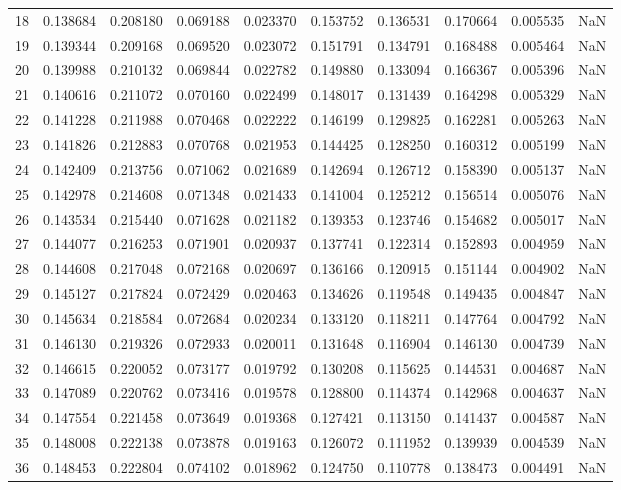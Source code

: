 \begin{tabular}{lrrrrrrrrr}
18 & 0.138684 & 0.208180 & 0.069188 & 0.023370 & 0.153752 & 0.136531 & 0.170664 & 0.005535 & NaN \\
19 & 0.139344 & 0.209168 & 0.069520 & 0.023072 & 0.151791 & 0.134791 & 0.168488 & 0.005464 & NaN \\
20 & 0.139988 & 0.210132 & 0.069844 & 0.022782 & 0.149880 & 0.133094 & 0.166367 & 0.005396 & NaN \\
21 & 0.140616 & 0.211072 & 0.070160 & 0.022499 & 0.148017 & 0.131439 & 0.164298 & 0.005329 & NaN \\
22 & 0.141228 & 0.211988 & 0.070468 & 0.022222 & 0.146199 & 0.129825 & 0.162281 & 0.005263 & NaN \\
23 & 0.141826 & 0.212883 & 0.070768 & 0.021953 & 0.144425 & 0.128250 & 0.160312 & 0.005199 & NaN \\
24 & 0.142409 & 0.213756 & 0.071062 & 0.021689 & 0.142694 & 0.126712 & 0.158390 & 0.005137 & NaN \\
25 & 0.142978 & 0.214608 & 0.071348 & 0.021433 & 0.141004 & 0.125212 & 0.156514 & 0.005076 & NaN \\
26 & 0.143534 & 0.215440 & 0.071628 & 0.021182 & 0.139353 & 0.123746 & 0.154682 & 0.005017 & NaN \\
27 & 0.144077 & 0.216253 & 0.071901 & 0.020937 & 0.137741 & 0.122314 & 0.152893 & 0.004959 & NaN \\
28 & 0.144608 & 0.217048 & 0.072168 & 0.020697 & 0.136166 & 0.120915 & 0.151144 & 0.004902 & NaN \\
29 & 0.145127 & 0.217824 & 0.072429 & 0.020463 & 0.134626 & 0.119548 & 0.149435 & 0.004847 & NaN \\
30 & 0.145634 & 0.218584 & 0.072684 & 0.020234 & 0.133120 & 0.118211 & 0.147764 & 0.004792 & NaN \\
31 & 0.146130 & 0.219326 & 0.072933 & 0.020011 & 0.131648 & 0.116904 & 0.146130 & 0.004739 & NaN \\
32 & 0.146615 & 0.220052 & 0.073177 & 0.019792 & 0.130208 & 0.115625 & 0.144531 & 0.004687 & NaN \\
33 & 0.147089 & 0.220762 & 0.073416 & 0.019578 & 0.128800 & 0.114374 & 0.142968 & 0.004637 & NaN \\
34 & 0.147554 & 0.221458 & 0.073649 & 0.019368 & 0.127421 & 0.113150 & 0.141437 & 0.004587 & NaN \\
35 & 0.148008 & 0.222138 & 0.073878 & 0.019163 & 0.126072 & 0.111952 & 0.139939 & 0.004539 & NaN \\
36 & 0.148453 & 0.222804 & 0.074102 & 0.018962 & 0.124750 & 0.110778 & 0.138473 & 0.004491 & NaN \\

\end{tabular}
